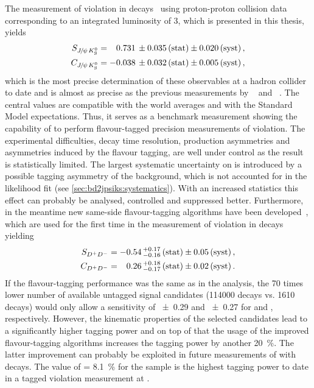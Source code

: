 The measurement of \CP violation in \BdToJPsiKS
decays~\cite{LHCb-PAPER-2015-004} using proton-proton collision data
corresponding to an integrated luminosity of \SI{3}{\invfb}, which is
presented in this thesis, yields
\begin{align*}
  S_{{{J\mskip -3mu/\mskip -2mu\psi\mskip 2mu}}{{K}^0_{\mathrm{ \scriptscriptstyle S}}}} &=  \phantom{-}0.731 \, \pm 0.035 \, \text{(stat)} \pm 0.020 \, \text{(syst)}\,, \\
  C_{{{J\mskip -3mu/\mskip -2mu\psi\mskip 2mu}}{{K}^0_{\mathrm{ \scriptscriptstyle S}}}} &=  			- 0.038 \, \pm 0.032 \, \text{(stat)} \pm 0.005 \, \text{(syst)}\,,
\end{align*}
which is the most precise determination of these \CP observables at a hadron
collider to date and is almost as precise as the previous measurements by
\babar~\cite{BaBar_sin2beta} and \belle~\cite{Belle_sin2beta}. The central
values are compatible with the world averages and with the Standard Model
expectations. Thus, it serves as a benchmark measurement showing the
capability of \lhcb to perform flavour-tagged precision measurements of \CP
violation. The experimental difficulties, \eg decay time resolution,
production asymmetries and asymmetries induced by the flavour tagging, are
well under control as the result is statistically limited. The largest
systematic uncertainty on \SJpsiKS is introduced by a possible tagging
asymmetry of the background, which is not accounted for in the likelihood fit
(see \cref{sec:bd2jpsiks:systematics}). With an increased statistics this
effect can probably be analysed, controlled and suppressed better.
Furthermore, in the meantime new same-side flavour-tagging algorithms have
been developed~\cite{LHCb-PAPER-2016-039}, which are used for the first time
in the measurement of \CP violation in \BdToDD
decays~\cite{LHCb-PAPER-2016-037} yielding
\begin{align*}
  S_{{{D}^+}{{D}^-}} &=  -0.54 \, ^{+0.17}_{-0.16} \, \text{(stat)} \pm 0.05 \, \text{(syst)}\,, \\
  C_{{{D}^+}{{D}^-}} &=  \phantom{-}0.26 \, ^{+0.18}_{-0.17} \, \text{(stat)} \pm 0.02 \, \text{(syst)}\,.
\end{align*}
If the flavour-tagging performance was the same as in the \BdToJPsiKS
analysis, the 70 times lower number of available untagged signal candidates
(\num{114000} \BdToJPsiKS decays vs. \num{1610} \BdToDD decays) would only
allow a sensitivity of \num{\pm0.29} and \num{\pm0.27} for \SDD and
\CDD, respectively. However, the kinematic properties of the selected \BdToDD
candidates lead to a significantly higher tagging power and on top of that the
usage of the improved flavour-tagging algorithms increases the tagging power
by another \SI{20}{\percent}. The latter improvement can probably be exploited
in future measurements of \sintwobeta with \BdToJPsiKS decays. The value of
\effeff = \SI{8.1}{\percent} for the \BdToDD sample is the highest tagging
power to date in a tagged \CP violation measurement at \lhcb.

